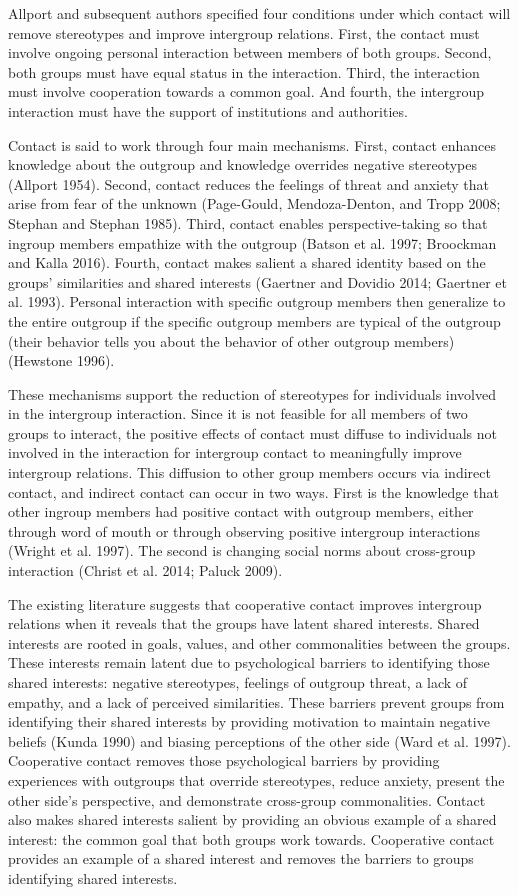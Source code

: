 \documentclass[11pt]{article}
\begin{document}
Allport and subsequent authors specified four conditions under which
contact will remove stereotypes and improve intergroup relations. First,
the contact must involve ongoing personal interaction between members of
both groups. Second, both groups must have equal status in the
interaction. Third, the interaction must involve cooperation towards a
common goal. And fourth, the intergroup interaction must have the
support of institutions and authorities.

Contact is said to work through four main mechanisms. First, contact
enhances knowledge about the outgroup and knowledge overrides negative
stereotypes (Allport 1954). Second, contact reduces the feelings of
threat and anxiety that arise from fear of the unknown (Page-Gould,
Mendoza-Denton, and Tropp 2008; Stephan and Stephan 1985). Third,
contact enables perspective-taking so that ingroup members empathize
with the outgroup (Batson et al. 1997; Broockman and Kalla 2016).
Fourth, contact makes salient a shared identity based on the groups'
similarities and shared interests (Gaertner and Dovidio 2014; Gaertner
et al. 1993). Personal interaction with specific outgroup members then
generalize to the entire outgroup if the specific outgroup members are
typical of the outgroup (their behavior tells you about the behavior of
other outgroup members) (Hewstone 1996).

These mechanisms support the reduction of stereotypes for individuals
involved in the intergroup interaction. Since it is not feasible for all
members of two groups to interact, the positive effects of contact must
diffuse to individuals not involved in the interaction for intergroup
contact to meaningfully improve intergroup relations. This diffusion to
other group members occurs via indirect contact, and indirect contact
can occur in two ways. First is the knowledge that other ingroup members
had positive contact with outgroup members, either through word of mouth
or through observing positive intergroup interactions (Wright et al.
1997). The second is changing social norms about cross-group interaction
(Christ et al. 2014; Paluck 2009).

The existing literature suggests that cooperative contact improves
intergroup relations when it reveals that the groups have latent shared
interests. Shared interests are rooted in goals, values, and other
commonalities between the groups. These interests remain latent due to
psychological barriers to identifying those shared interests: negative
stereotypes, feelings of outgroup threat, a lack of empathy, and a lack
of perceived similarities. These barriers prevent groups from
identifying their shared interests by providing motivation to maintain
negative beliefs (Kunda 1990) and biasing perceptions of the other side
(Ward et al. 1997). Cooperative contact removes those psychological
barriers by providing experiences with outgroups that override
stereotypes, reduce anxiety, present the other side's perspective, and
demonstrate cross-group commonalities. Contact also makes shared
interests salient by providing an obvious example of a shared interest:
the common goal that both groups work towards. Cooperative contact
provides an example of a shared interest and removes the barriers to
groups identifying shared interests.
\end{document}
